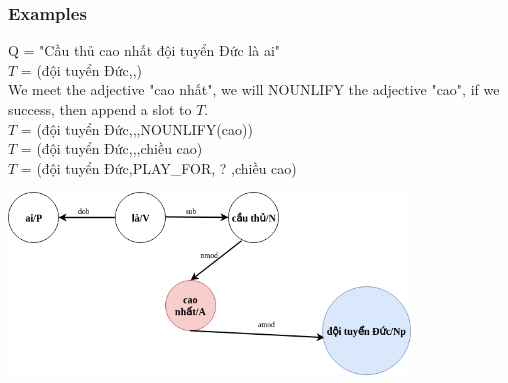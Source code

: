 \documentclass{beamer}
\begin{document}
\begin{frame}
	\frametitle{Examples}
	
	Q = "Cầu thủ cao nhất đội tuyển Đức là ai"\\
	$T$ = (đội tuyển Đức,,)\\
	
	We meet the adjective "cao nhất", we will NOUNLIFY the adjective "cao", if we success, then append a slot to $T$.\\
	$T$ = (đội tuyển Đức,,,NOUNLIFY(cao))\\
	$T$ = (đội tuyển Đức,,,chiều cao)\\
	$T$ = (đội tuyển Đức,PLAY\_FOR, ? ,chiều cao)\\
	
	
	\begin{center} 
		\centering 
			\includegraphics[width=0.8\textwidth,height=0.8\textheight,keepaspectratio]{thirdextree2}
			\vspace{0.5cm} 
	\end{center}
		
\end{frame}
\end{document}

